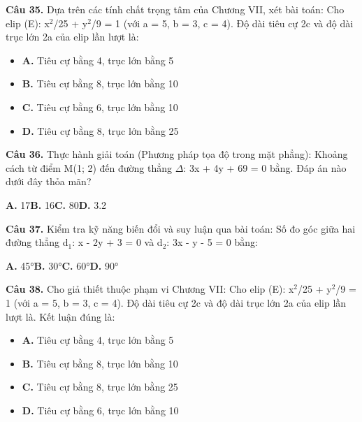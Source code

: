 \documentclass[11pt,a4paper]{article}
\begin{document}
\textbf{\color{primary} Câu 35.} Dựa trên các tính chất trọng tâm của Chương VII, xét bài toán: Cho elip (E): x$^2$/25 + y$^2$/9 = 1 (với a = 5, b = 3, c = 4). Độ dài tiêu cự 2c và độ dài trục lớn 2a của elip lần lượt là:\par
\begin{itemize}\setlength{\itemsep}{1pt}\setlength{\parskip}{0pt}
  \item[] \textbf{A.} Tiêu cự bằng 4, trục lớn bằng 5
  \item[] \textbf{B.} Tiêu cự bằng 8, trục lớn bằng 10
  \item[] \textbf{C.} Tiêu cự bằng 6, trục lớn bằng 10
  \item[] \textbf{D.} Tiêu cự bằng 8, trục lớn bằng 25
\end{itemize}\vspace{2pt}
\textbf{\color{primary} Câu 36.} Thực hành giải toán (Phương pháp tọa độ trong mặt phẳng): Khoảng cách từ điểm M(1; 2) đến đường thẳng $\Delta$: 3x + 4y + 69 = 0 bằng. Đáp án nào dưới đây thỏa mãn?\par
\hspace*{1.5em}\textbf{A.} 17\quad\quad \textbf{B.} 16\quad\quad \textbf{C.} 80\quad\quad \textbf{D.} 3.2\par\vspace{2pt}
\textbf{\color{primary} Câu 37.} Kiểm tra kỹ năng biến đổi và suy luận qua bài toán: Số đo góc giữa hai đường thẳng d$_1$: x - 2y + 3 = 0 và d$_2$: 3x - y - 5 = 0 bằng:\par
\hspace*{1.5em}\textbf{A.} 45°\quad\quad \textbf{B.} 30°\quad\quad \textbf{C.} 60°\quad\quad \textbf{D.} 90°\par\vspace{2pt}
\textbf{\color{primary} Câu 38.} Cho giả thiết thuộc phạm vi Chương VII: Cho elip (E): x$^2$/25 + y$^2$/9 = 1 (với a = 5, b = 3, c = 4). Độ dài tiêu cự 2c và độ dài trục lớn 2a của elip lần lượt là. Kết luận đúng là:\par
\begin{itemize}\setlength{\itemsep}{1pt}\setlength{\parskip}{0pt}
  \item[] \textbf{A.} Tiêu cự bằng 4, trục lớn bằng 5
  \item[] \textbf{B.} Tiêu cự bằng 8, trục lớn bằng 10
  \item[] \textbf{C.} Tiêu cự bằng 8, trục lớn bằng 25
  \item[] \textbf{D.} Tiêu cự bằng 6, trục lớn bằng 10
\end{itemize}\vspace{2pt}
\end{document}
